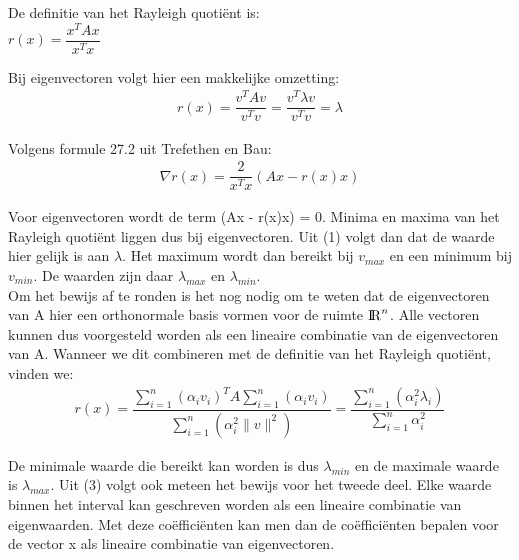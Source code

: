 De definitie van het Rayleigh quoti\"ent is:\\

$r(x) = \dfrac{x^{T}Ax}{x^{T}x}$

Bij eigenvectoren volgt hier een makkelijke omzetting:\\

\begin{equation}
\begin{gathered}
r(x) = \dfrac{v^{T}Av}{v^{T}v} = \dfrac{v^{T}\lambda v}{v^{T}v} = \lambda
\end{gathered}
\end{equation}

Volgens formule 27.2 uit Trefethen en Bau:\\

\begin{equation}
\begin{gathered}
\nabla r(x) = \dfrac{2}{x^{T}x}(Ax - r(x)x)
\end{gathered}
\end{equation}

Voor eigenvectoren wordt de term (Ax - r(x)x) = 0. Minima en maxima van het Rayleigh quoti\"ent liggen dus bij eigenvectoren. Uit (1) volgt dan dat de waarde hier gelijk is aan $\lambda$. Het maximum wordt dan bereikt bij $v_{max}$ en een minimum bij $v_{min}$. De waarden zijn daar $\lambda_{max}$ en $\lambda_{min}$.\\[12pt]

Om het bewijs af te ronden is het nog nodig om te weten dat de eigenvectoren van A hier een orthonormale basis vormen voor de ruimte ${\rm I\!R}^{n}$. Alle vectoren kunnen dus voorgesteld worden als een lineaire combinatie van de eigenvectoren van A. Wanneer we dit combineren met de definitie van het Rayleigh quoti\"ent, vinden we:\\[12pt]

\begin{equation}
\begin{gathered}
r(x) = \dfrac{\sum_{i=1}^{n}(\alpha_{i}v_{i})^{T}A\sum_{i=1}^{n}(\alpha_{i}v_{i})}{\sum_{i=1}^{n}(\alpha_{i}^{2}\|v\|^{2})} = \dfrac{\sum_{i=1}^{n}(\alpha_{i}^{2}\lambda_{i})}{\sum_{i=1}^{n}\alpha_{i}^{2}}
\end{gathered}
\end{equation}

De minimale waarde die bereikt kan worden is dus $\lambda_{min}$ en de maximale waarde is $\lambda_{max}$. Uit (3) volgt ook meteen het bewijs voor het tweede deel. Elke waarde binnen het interval kan geschreven worden als een lineaire combinatie van eigenwaarden. Met deze co\"effici\"enten kan men dan de co\"effici\"enten bepalen voor de vector x als lineaire combinatie van eigenvectoren.\\